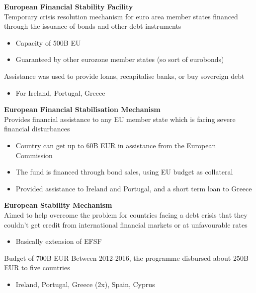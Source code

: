 \documentclass{beamer}
\begin{document}
\begin{frame}
  \textbf{European Financial Stability Facility}\\
  Temporary crisis resolution mechanism for euro area member states financed through the issuance of bonds and other debt instruments
  \begin{itemize}
    \item Capacity of 500B EU
    \item Guaranteed by other eurozone member states (so sort of eurobonds)
  \end{itemize}
    \medskip
   Assistance was used to provide loans, recapitalise banks, or buy sovereign debt    
   \begin{itemize}
     \item For Ireland, Portugal, Greece
   \end{itemize}
\end{frame}

\begin{frame}
  \textbf{European Financial Stabilisation Mechanism}\\
   Provides financial assistance to any EU member state which is facing severe financial disturbances
   \begin{itemize}
     \item Country can get up to 60B EUR in assistance from the European Commission 
     \item The fund is financed through  bond sales, using EU budget as collateral    
    \item Provided assistance to Ireland and Portugal, and a short term loan to Greece
   \end{itemize}
\end{frame}

\begin{frame}
  \textbf{European Stability Mechanism}\\
  Aimed to help overcome the problem for countries facing a debt crisis that they couldn't get credit from international financial markets or at unfavourable rates
  \begin{itemize}
    \item Basically extension of EFSF
  \end{itemize}
  Budget of 700B EUR
  Between 2012-2016, the programme disbursed about 250B EUR to five countries
\begin{itemize}
  \item Ireland, Portugal, Greece (2x), Spain, Cyprus 
\end{itemize}
\end{frame}
\end{document}
